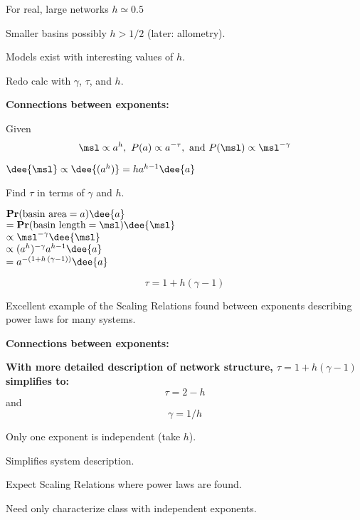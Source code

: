     For real, large networks $h \simeq 0.5$
   
    Smaller basins possibly $h>1/2$ (later: allometry).
   
    Models exist with interesting values of $h$.
   
     Redo calc with $\gamma$, $\tau$, and $h$.
  
  
  

  \textbf{Connections between exponents:}

  
  
      
    Given $$ \msl \propto a^{h}, \ P(a) \propto a^{-\tau},\ \mbox{and} \  P(\msl) \propto \msl^{-\gamma}$$
      
    $ \dee{\msl} \propto \dee{(a^{h})} = h a^{h-1} \dee{a} $    
     
    Find $\tau$ in terms of $\gamma$ and $h$.
     
    $
    \mathbf{Pr}(\mbox{basin area} = a) \dee{a}
    $\\
    $
    =
    \mathbf{Pr}(\mbox{basin length} = \msl) \dee{\msl}
    $\\
    {
    $
    \propto
    \msl^{-\gamma} \dee{\msl} 
    $\\}
    {
    $
    \propto
    (a^{h})^{-\gamma} a^{h-1} \dee{a} 
    $\\}
    {
    $
    =
    a^{-(1+h\, (\gamma-1))} \dee{a} 
    $\\}
    
      $$\boxed{\tau = 1 + h(\gamma-1)} $$
    
      Excellent example of the \alert{Scaling Relations}
      found between exponents describing power laws
      for many systems.
  
  



  \textbf{Connections between exponents:}

  \textbf{With more detailed description of network structure,
      $\tau = 1 + h(\gamma-1)$ simplifies to:\cite{dodds1999a}}
    $$\boxed{\tau = 2 - h}$$
    and
    $$\boxed{\gamma = 1/h}$$
  

  
    
     
      Only one exponent is independent (take $h$).
     
      Simplifies system description.
     
      Expect Scaling Relations where power laws are found.
    
      Need only characterize 
      class with independent exponents.
  
